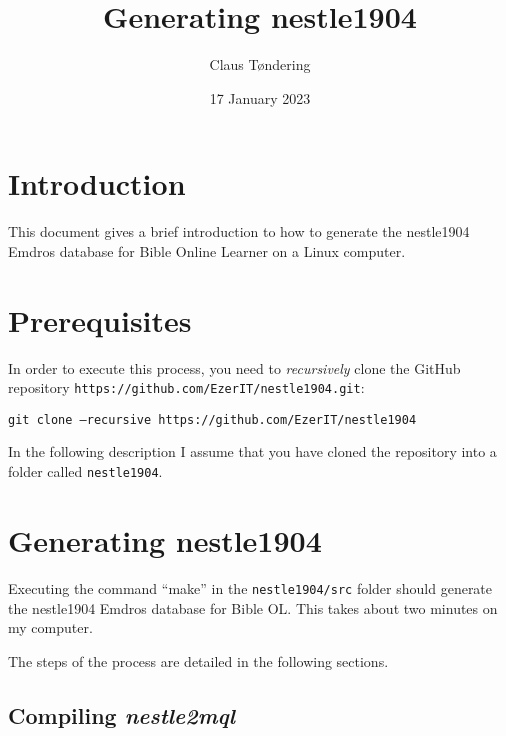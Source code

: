 \documentclass[11pt,oneside,a4paper,article]{memoir}
\title{Generating nestle1904}
\author{Claus Tøndering}
\date{17 January 2023}
\begin{document}
\maketitle


\chapter{Introduction}

This document gives a brief introduction to how to generate the nestle1904 Emdros database for Bible
Online Learner on a Linux computer.

\chapter{Prerequisites}

In order to execute this process, you need to \emph{recursively} clone the GitHub repository
\texttt{https://github.com/EzerIT/nestle1904.git}:

\vspace{1ex}

\quad\texttt{git clone --recursive https://github.com/EzerIT/nestle1904}

\vspace{1ex}

In the following description I assume that you have cloned the repository into a folder called
\texttt{nestle1904}.




\chapter{Generating nestle1904}

Executing the command ``make'' in the \texttt{nestle1904/src} folder should generate the nestle1904
Emdros database for Bible OL. This takes about two minutes on my computer.

The steps of the process are detailed in the following sections.


\section{Compiling \emph{nestle2mql}}
\end{document}
